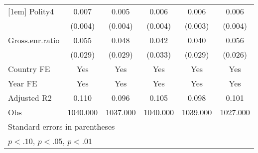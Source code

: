 \begin{table}[htbp]
{\begin{tabular}{l*{5}{c}}
[1em]
Polity4         &    0.007\sym{*}  &    0.005         &    0.006         &    0.006\sym{*}  &    0.006\sym{*}  \\
                &  (0.004)         &  (0.004)         &  (0.004)         &  (0.003)         &  (0.004)         \\
[1em]
Gross.enr.ratio &    0.055\sym{*}  &    0.048         &    0.042         &    0.040         &    0.056\sym{**} \\
                &  (0.029)         &  (0.029)         &  (0.033)         &  (0.029)         &  (0.026)         \\
\hline
Country FE      &\multicolumn{1}{c}{Yes}         &\multicolumn{1}{c}{Yes}         &\multicolumn{1}{c}{Yes}         &\multicolumn{1}{c}{Yes}         &\multicolumn{1}{c}{Yes}         \\
Year FE         &\multicolumn{1}{c}{Yes}         &\multicolumn{1}{c}{Yes}         &\multicolumn{1}{c}{Yes}         &\multicolumn{1}{c}{Yes}         &\multicolumn{1}{c}{Yes}         \\
Adjusted R2     &\multicolumn{1}{c}{0.110}         &\multicolumn{1}{c}{0.096}         &\multicolumn{1}{c}{0.105}         &\multicolumn{1}{c}{0.098}         &\multicolumn{1}{c}{0.101}         \\
Obs             &\multicolumn{1}{c}{1040.000}         &\multicolumn{1}{c}{1037.000}         &\multicolumn{1}{c}{1040.000}         &\multicolumn{1}{c}{1039.000}         &\multicolumn{1}{c}{1027.000}         \\
\hline\hline
\multicolumn{6}{l}{\footnotesize Standard errors in parentheses}\\
\multicolumn{6}{l}{\footnotesize \sym{*} \(p<.10\), \sym{**} \(p<.05\), \sym{***} \(p<.01\)}\\
\end{tabular}}
\end{table}
